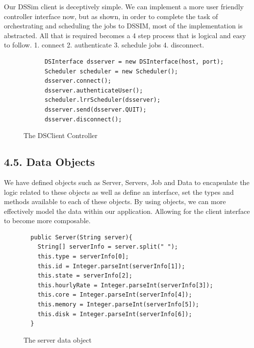 \documentclass[a4paper]{article} %
\begin{document}
Our DSSim client is deceptively simple. We can implement a more user friendly controller interface now, but as shown, in order to complete the task of orchestrating and scheduling the jobs to DSSIM, most of the implementation is abstracted. All that is required becomes a 4 step process that is logical and easy to follow. 1. connect 2. authenticate 3. schedule jobs 4. disconnect.


\begin{figure}[ht!]
\begin{lstlisting}
      DSInterface dsserver = new DSInterface(host, port);
      Scheduler scheduler = new Scheduler();
      dsserver.connect();
      dsserver.authenticateUser();
      scheduler.lrrScheduler(dsserver);
      dsserver.send(dsserver.QUIT);
      dsserver.disconnect();
\end{lstlisting}
\caption{The DSClient Controller}
\end{figure}

\subsection*{4.5. Data Objects}

We have defined objects such as Server, Servers, Job and Data to encapsulate the logic related to these objects as well as define an interface, set the types and methods available to each of these objects. By using objects, we can more effectively model the data within our application. Allowing for the client interface to become more composable.

\begin{figure}[ht!]
\begin{lstlisting}
  public Server(String server){
    String[] serverInfo = server.split(" ");
    this.type = serverInfo[0];
    this.id = Integer.parseInt(serverInfo[1]);
    this.state = serverInfo[2];
    this.hourlyRate = Integer.parseInt(serverInfo[3]);
    this.core = Integer.parseInt(serverInfo[4]);
    this.memory = Integer.parseInt(serverInfo[5]);
    this.disk = Integer.parseInt(serverInfo[6]);
  }

\end{lstlisting}
\caption{The server data object}
\end{figure}
\end{document}

